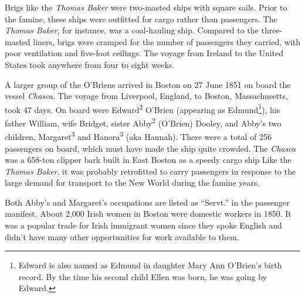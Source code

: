 Brigs like the \textit{Thomas Baker} were two-masted ships with square sails.\cite{OHanlon:35} Prior to the famine, these ships were outfitted for cargo rather than passengers.\cite{Laxton:9} The \textit{Thomas Baker}, for instance, was a coal-hauling ship.\cite{MorningAdvertiser} Compared to the three-masted liners, brigs were cramped for the number of passengers they carried, with poor ventilation and five-foot ceilings.\cite{OHanlon:33} The voyage from Ireland to the United States took anywhere from four to eight weeks.

A larger group of the O'Briens arrived in Boston on 27 June 1851 on board the vessel \textit{Chasca}\cite{Chascay:1}. The voyage from Liverpool, England, to Boston, Massachusetts, took 47 days.\cite{Chascay2:1} On board were Edward\textsuperscript{2} O'Brien (appearing as Edmund\footnote{Edward is also named as Edmund in daughter Mary Ann O'Brien's birth record. By the time his second child Ellen was born, he was going by Edward.}), his father William, wife Bridget, sister Abby\textsuperscript{2} (O'Brien) Dooley, and Abby's two children, Margaret\textsuperscript{3} and Hanora\textsuperscript{3} (aka Hannah). There were a total of 256 passengers on board,\cite{Chascay:2} which must have made the ship quite crowded. The \textit{Chasca} was a 658-ton clipper bark built in East Boston as a speedy cargo ship\cite{ChascaCard,Chascay:3} Like the \textit{Thomas Baker}, it was probably retrofitted to carry passengers in response to the large demand for transport to the New World during the famine years.

Both Abby's and Margaret's occupations are listed as ``Servt.'' in the passenger manifest.\cite{Chascay:4} About 2,000 Irish women in Boston were domestic workers in 1850. It was a popular trade for Irish immigrant women since they spoke English and didn't have many other opportunities for work available to them.\cite{Ryan:41}

